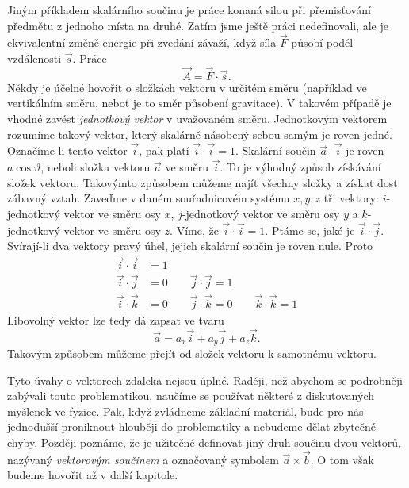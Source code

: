 {    Jiným příkladem skalárního součinu je práce konaná silou při přemisťování předmětu z jednoho 
    místa na druhé. Zatím jsme ještě práci nedefinovali, ale je ekvivalentní změně energie při 
    zvedání závaží, když síla \(\vec{F}\) působí podél vzdálenosti \(\vec{s}\). Práce
    \begin{equation}\label{FYZ:eq166}
      \vec{A} = \vec{F}\cdot\vec{s}.
    \end{equation}
    Někdy je účelné hovořit o složkách vektoru v určitém směru (například ve vertikálním směru, 
    neboť je to směr působení gravitace). V takovém případě je vhodné zavést \emph{jednotkový 
    vektor} v uvažovaném směru. Jednotkovým vektorem rozumíme takový vektor, který skalárně 
    násobený sebou samým je roven jedné. Označíme-li tento vektor \(\vec{i}\), pak platí 
    \(\vec{i}\cdot\vec{i} = 1\). Skalární součin \(\vec{a}\cdot\vec{i}\) je roven 
    \(a\cos\vartheta\), neboli složka vektoru \(\vec{a}\) ve směru \(\vec{i}\). To je výhodný 
    způsob získávání složek vektoru. Takovýmto způsobem můžeme najít všechny složky a získat dost 
    zábavný vztah. Zaveďme v daném souřadnicovém systému \(x, y, z\) tři vektory: 
    \(i\)-jednotkový vektor ve směru osy \(x\), \(j\)-jednotkový vektor ve směru osy \(y\) a 
    \(k\)-jednotkový vektor ve směru osy \(z\). Víme, že \(\vec{i}\cdot\vec{i} = 1\). Ptáme se, 
    jaké je \(\vec{i}\cdot\vec{j}\). Svírají-li dva vektory pravý úhel, jejich skalární součin je 
    roven nule. Proto
    \begin{align}
      \vec{i}\cdot\vec{i} &= 1                                      \nonumber    \\
      \vec{i}\cdot\vec{j} &= 0 \qquad \vec{j}\cdot\vec{j} = 1       \label{FYZ:eq167} \\
      \vec{i}\cdot\vec{k} &= 0 \qquad \vec{j}\cdot\vec{k} = 0 
                               \qquad \vec{k}\cdot\vec{k} = 1       \nonumber
    \end{align}
    Libovolný vektor lze tedy dá zapsat ve tvaru
    \begin{equation}\label{FYZ:eq168}
      \vec{a} = a_x\vec{i} + a_y\vec{j} + a_z\vec{k}.
    \end{equation}
    Takovým způsobem můžeme přejít od složek vektoru k samotnému vektoru.
    
    Tyto úvahy o vektorech zdaleka nejsou úplné. Raději, než abychom se podrobněji zabývali touto
    problematikou, naučíme se používat některé z diskutovaných myšlenek ve fyzice. Pak, když 
    zvládneme základní materiál, bude pro nás jednodušší proniknout hlouběji do problematiky a 
    nebudeme dělat zbytečné chyby. Později poznáme, že je užitečné definovat jiný druh součinu dvou 
    vektorů, nazývaný \emph{vektorovým součinem} a označovaný symbolem \(\vec{a}\times\vec{b}\). O 
    tom však budeme hovořit až v další kapitole.
    
}

